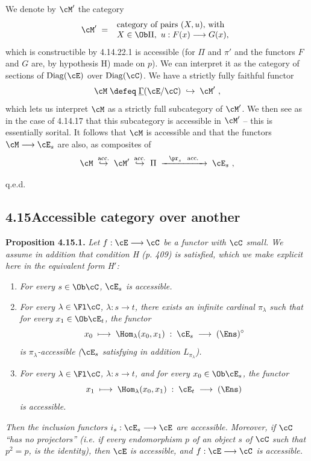 
We denote by $\cM'$ the category
\[
\cM' \;=\;
\begin{array}{l}
\text{category of pairs } (X,u)\text{, with}\\
X \in \Ob\Pi,\ u : F(x) \longrightarrow G(x),
\end{array}
\] %
which is constructible by 4.14.22.1 is accessible (for $\Pi$ and $\pi'$ and the functors $F$ and $G$ are, by hypothesis H) made on $p$). We can interpret it as the category of sections %
of $\mathrm{Diag}(\cE)$ over $\mathrm{Diag}(\cC)$. We have a strictly fully faithful functor
\[
\cM \;\defeq\; \underline{\Gamma}(\cE/\cC) \;\hookrightarrow\; \cM'\ ,
\]
which lets us interpret $\cM$ as a strictly full subcategory of $\cM'$. We then see as in the case of 4.14.17 that this subcategory is accessible in $\cM'$ -- this is essentially sorital. It follows that $\cM$ is accessible and that the functors $\cM \longrightarrow \cE_s$ are also, as composites of
\[
\cM \;\overset{\text{\upshape acc.}}{\hookrightarrow}\; \cM' \;\overset{\text{\upshape acc.}}{\hookrightarrow}\; \Pi \;\xrightarrow{\ \ \pr_s\ \ \text{\upshape acc.}\ \ }\; \cE_s\ ,
\]

\hfill q.e.d.


\subsection*{4.15\quad Accessible category over another}

\textbf{Proposition 4.15.1.} \textit{Let $f : \cE \longrightarrow \cC$ be a functor with $\cC$ small. We assume in addition that condition H (p. 409) is satisfied, which we make explicit here in the equivalent form H$'$:}
\begin{enumerate}
\item[\textit{H 1)}] \textit{For every $s \in \Ob\cC$, $\cE_s$ is accessible.}
\item[\textit{H 2)}] \textit{For every $\lambda \in \Fl\cC$, $\lambda : s \longrightarrow t$, there exists an infinite cardinal $\pi_\lambda$ such that for every $x_1 \in \Ob\cE_t$, the functor}
\[
x_0 \;\longmapsto\; \Hom_\lambda(x_0,x_1) \;:\; \cE_s \;\longrightarrow\; (\Ens)^\circ
\]
\textit{is $\pi_\lambda$-accessible ($\cE_s$ satisfying in addition $L_{\pi_\lambda}$).}
\item[\textit{H 3)}] \textit{For every $\lambda \in \Fl\cC$, $\lambda : s \longrightarrow t$, and for every $x_0 \in \Ob\cE_s$, the functor}
\[
x_1 \;\longmapsto\; \Hom_\lambda(x_0,x_1) \;:\; \cE_t \;\longrightarrow\; (\Ens)
\]
\textit{is accessible.}
\end{enumerate}
\textit{Then the inclusion functors $i_s : \cE_s \longrightarrow \cE$ are accessible. Moreover, if $\cC$ ``has no projectors'' (i.e. if every endomorphism $p$ of an object $s$ of $\cC$ such that $p^2 = p$, is the identity), then $\cE$ is accessible, and $f : \cE \longrightarrow \cC$ is accessible.}

